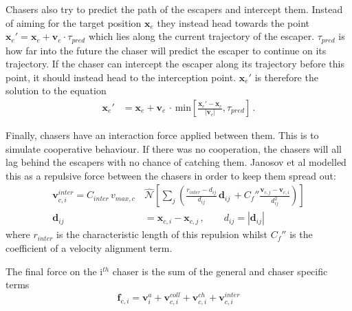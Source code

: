 \documentclass[%
11pt,
amsmath, amssymb,
aps,
pra
]{revtex4-2}
\begin{document}
Chasers also try to predict the path of the escapers and intercept them. Instead of aiming for the target position 
\(\mathbf{x}_e\) they instead head towards the point \(\mathbf{x}_e' = \mathbf{x}_e + \mathbf{v}_e\cdot\tau_{pred}\) 
which lies along the current trajectory of the escaper. \(\tau_{pred}\) is how far into the future the chaser will predict the
escaper to continue on its trajectory. If the chaser can intercept the escaper along its trajectory before this point,
it should instead head to the interception point. \(\mathbf{x}_e'\) is therefore the solution to the equation
\begin{align}
    \mathbf{x}_e' &= \mathbf{x}_e + \mathbf{v}_e\,\cdot\,\text{min}\left[ 
        \frac{\mathbf{x}_e' - \mathbf{x}_c}{|\mathbf{v}_c|}, \tau_{pred}
    \right]\,.
\end{align} 

Finally, chasers have an interaction force applied between them. This is to simulate cooperative behaviour. If there was
no cooperation, the chasers will all lag behind the escapers with no chance of catching them. Janosov et al modelled 
this as a repulsive force between the chasers in order to keep them spread out:
\begin{align}
    \mathbf{v}_{c,i}^{inter} = C_{inter} \, v_{max, c}\, &\hat{\mathcal{N}}\left[ 
        \sum_{j}\left( \frac{r_{inter} - d_{ij}}{d_{ij}} \, \mathbf{d}_{ij} \,+ C_f''
        \frac{\mathbf{v}_{c, j} - \mathbf{v}_{c, i}}{d_{ij}^2} \right)
    \right] \\
    \mathbf{d}_{ij} &= \mathbf{x}_{c, i} - \mathbf{x}_{c, j}\,, \quad\quad d_{ij} = |\mathbf{d}_{ij}|
\end{align}
where \(r_{inter}\) is the characteristic length of this repulsion whilst \(C_f''\) is the coefficient of a velocity alignment term.

The final force on the i\(^{th}\) chaser is the sum of the general and chaser specific terms
\begin{equation}
    \mathbf{f}_{c, i} = \mathbf{v}_i^a + \mathbf{v}_{c, i}^{coll} + \mathbf{v}_{c, i}^{ch} + \mathbf{v}_{c,i}^{inter}
\end{equation}
\end{document}
